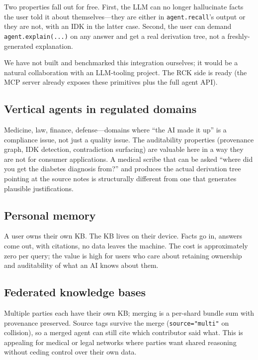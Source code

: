 \documentclass[11pt]{article}
\begin{document}
Two properties fall out for free. First, the LLM can no longer
hallucinate facts the user told it about themselves---they are
either in \texttt{agent.recall}'s output or they are not, with an
IDK in the latter case. Second, the user can demand
\texttt{agent.explain(...)} on any answer and get a real derivation
tree, not a freshly-generated explanation.

We have not built and benchmarked this integration ourselves; it
would be a natural collaboration with an LLM-tooling project. The
RCK side is ready (the MCP server already exposes these primitives
plus the full agent API).

\subsection{Vertical agents in regulated domains}

Medicine, law, finance, defense---domains where ``the AI made it
up'' is a compliance issue, not just a quality issue. The
auditability properties (provenance graph, IDK detection,
contradiction surfacing) are valuable here in a way they are not
for consumer applications. A medical scribe that can be asked
``where did you get the diabetes diagnosis from?'' and produces
the actual derivation tree pointing at the source notes is
structurally different from one that generates plausible
justifications.

\subsection{Personal memory}

A user owns their own KB. The KB lives on their device. Facts go
in, answers come out, with citations, no data leaves the machine.
The cost is approximately zero per query; the value is high for
users who care about retaining ownership and auditability of what
an AI knows about them.

\subsection{Federated knowledge bases}

Multiple parties each have their own KB; merging is a per-shard
bundle sum with provenance preserved. Source tags survive the
merge (\texttt{source="multi"} on collision), so a merged agent
can still cite which contributor said what. This is appealing for
medical or legal networks where parties want shared reasoning
without ceding control over their own data.
\end{document}
